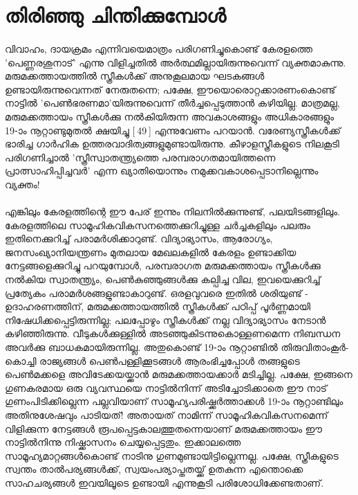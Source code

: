 \section{തിരിഞ്ഞു ചിന്തിക്കുമ്പോൾ}
\paragraph{}വിവാഹം, ദായക്രമം എന്നിവയെമാത്രം പരിഗണിച്ചുകൊണ്ട് കേരളത്തെ 'പെണ്ണരശുനാട്' എന്നു വിളിച്ചതിൽ അർത്ഥമില്ലായിരുന്നുവെന്ന് വ്യക്തമാകുന്നു. മരുമക്കത്തായത്തിൽ സ്ത്രീകൾക്ക് അനുകൂലമായ ഘടകങ്ങൾ ഉണ്ടായിരുന്നുവെന്നത് നേരുതന്നെ; പക്ഷേ, ഈയൊരൊറ്റക്കാരണംകൊണ്ട് നാട്ടിൽ 'പെൺഭരണമാ'യിരുന്നുവെന്ന് തീർച്ചപ്പെടുത്താൻ കഴിയില്ല. മാത്രമല്ല, മരുമക്കത്തായം സ്ത്രീകൾക്കു നൽകിയിരുന്ന അവകാശങ്ങളും അധികാരങ്ങളും 19-ാം നൂറ്റാണ്ടുമുതൽ ക്ഷയിച്ചു [ 49 ] എന്നുവേണം പറയാൻ. വരേണ്യസ്ത്രീകൾക്ക് ഭാരിച്ച ഗാർഹിക ഉത്തരവാദിത്വങ്ങളുമുണ്ടായിരുന്നു. കീഴാളസ്ത്രീകളുടെ നിലകൂടി പരിഗണിച്ചാൽ 'സ്ത്രീസ്വാതന്ത്ര്യത്തെ പരമ്പരാഗതമായിത്തന്നെ പ്രാത്സാഹിപ്പിച്ചവർ' എന്ന ഖ്യാതിയൊന്നും നമുക്കവകാശപ്പെടാനില്ലെന്നും വ്യക്തം!
\paragraph{}എങ്കിലും കേരളത്തിന്റെ ഈ പേര് ഇന്നും നിലനിൽക്കുന്നുണ്ട്, പലയിടങ്ങളിലും. കേരളത്തിലെ സാമൂഹികവികസനത്തെക്കുറിച്ചുള്ള ചർച്ചകളിലും പലരും ഇതിനെക്കുറിച്ച് പരാമർശിക്കാറുണ്ട്. വിദ്യാഭ്യാസം, ആരോഗ്യം, ജനസംഖ്യാനിയന്ത്രണം മുതലായ മേഖലകളിൽ കേരളം ഉണ്ടാക്കിയ നേട്ടങ്ങളെക്കുറിച്ചു പറയുമ്പോൾ, പരമ്പരാഗത മരുമക്കത്തായം സ്ത്രീകൾക്കു നൽകിയ സ്വാതന്ത്ര്യം, പെൺകുഞ്ഞുങ്ങൾക്കു കല്പിച്ച വില, ഇവയെക്കുറിച്ച് പ്രത്യേകം പരാമർശങ്ങളുണ്ടാകാറുണ്ട്. ഒരളവുവരെ ഇതിൽ ശരിയുണ്ട് - ഉദാഹരണത്തിന്, മരുമക്കത്തായത്തിൽ സ്ത്രീകൾക്ക് പഠിപ്പ് പൂർണ്ണമായി നിഷേധിക്കപ്പെട്ടിരുന്നില്ല; പലപ്പോഴും സ്ത്രീകൾക്ക് നല്ല വിദ്യാഭ്യാസം നേടാൻ കഴിഞ്ഞിരുന്നു. വീടുകൾക്കുള്ളിൽ അടഞ്ഞുകിടന്നുകൊള്ളണമെന്ന നിബന്ധന അവർക്കു ബാധകമായിരുന്നില്ല. അതുകൊണ്ട് 19-ാം നൂറ്റാണ്ടിൽ തിരുവിതാംകൂർ-കൊച്ചി രാജ്യങ്ങൾ പെൺപള്ളിക്കൂടങ്ങൾ ആരംഭിച്ചപ്പോൾ തങ്ങളുടെ പെൺമക്കളെ അവിടേക്കയയ്ക്കാൻ മരുമക്കത്തായക്കാർ മടിച്ചില്ല. പക്ഷേ, ഇങ്ങനെ ഗുണകരമായ ഒരു വ്യവസ്ഥയെ നാട്ടിൽനിന്ന് അടിച്ചോടിക്കാതെ ഈ നാട് ഗുണംപിടിക്കില്ലെന്ന പല്ലവിയാണ് സാമൂഹ്യപരിഷ്ക്കർത്താക്കൾ 19-ാം നൂറ്റാണ്ടിലും അതിനുശേഷവും പാടിയത്! അതായത് നാമിന്ന് സാമൂഹികവികസനമെന്ന് വിളിക്കുന്ന നേട്ടങ്ങൾ രൂപപ്പെട്ടകാലത്തുതന്നെയാണ് മരുമക്കത്തായം ഈ നാട്ടിൽനിന്നു നിഷ്ക്കാസനം ചെയ്യപ്പെട്ടതും. ഇക്കാലത്തെ സാമൂഹ്യമാറ്റങ്ങൾകൊണ്ട് നാടിനു ഗുണമുണ്ടായിട്ടില്ലെന്നല്ല. പക്ഷേ, സ്ത്രീകളുടെ സ്വന്തം താൽപര്യങ്ങൾക്ക്, സ്വയംപര്യാപ്തതയ്ക്ക് ഉതകുന്ന എന്തൊക്കെ സാഹചര്യങ്ങൾ ഇവയിലൂടെ ഉണ്ടായി എന്നുകൂടി പരിശോധിക്കേണ്ടതാണ്.


